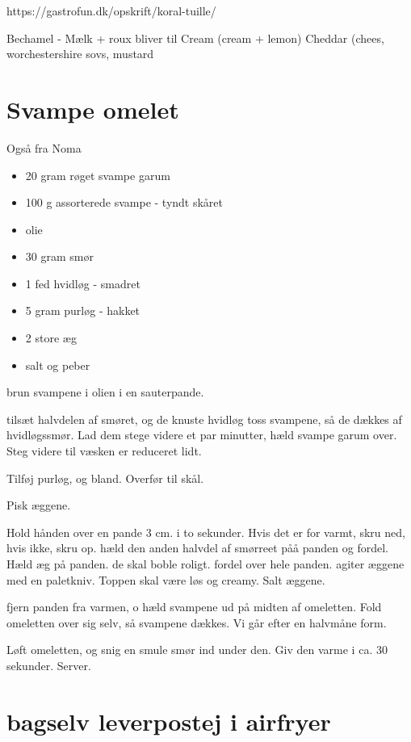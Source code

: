 \documentclass[
  letterpaper,
  DIV=11,
  numbers=noendperiod]{scrreprt}
\providecommand{\tightlist}{%
  \setlength{\itemsep}{0pt}\setlength{\parskip}{0pt}}\usepackage{longtable,booktabs,array}
\begin{document}
https://gastrofun.dk/opskrift/koral-tuille/

Bechamel - Mælk + roux bliver til Cream (cream + lemon) Cheddar (chees,
worchestershire sovs, mustard

\hypertarget{svampe-omelet}{%
\section{Svampe omelet}\label{svampe-omelet}}

Også fra Noma

\begin{itemize}
\tightlist
\item
  20 gram røget svampe garum
\item
  100 g assorterede svampe - tyndt skåret
\item
  olie
\item
  30 gram smør
\item
  1 fed hvidløg - smadret
\item
  5 gram purløg - hakket
\item
  2 store æg
\item
  salt og peber
\end{itemize}

brun svampene i olien i en sauterpande.

tilsæt halvdelen af smøret, og de knuste hvidløg toss svampene, så de
dækkes af hvidløgssmør. Lad dem stege videre et par minutter, hæld
svampe garum over. Steg videre til væsken er reduceret lidt.

Tilføj purløg, og bland. Overfør til skål.

Pisk æggene.

Hold hånden over en pande 3 cm. i to sekunder. Hvis det er for varmt,
skru ned, hvis ikke, skru op. hæld den anden halvdel af smørreet påå
panden og fordel. Hæld æg på panden. de skal boble roligt. fordel over
hele panden. agiter æggene med en paletkniv. Toppen skal være løs og
creamy. Salt æggene.

fjern panden fra varmen, o hæld svampene ud på midten af omeletten. Fold
omeletten over sig selv, så svampene dækkes. Vi går efter en halvmåne
form.

Løft omeletten, og snig en smule smør ind under den. Giv den varme i ca.
30 sekunder. Server.

\hypertarget{bagselv-leverpostej-i-airfryer}{%
\section{bagselv leverpostej i
airfryer}\label{bagselv-leverpostej-i-airfryer}}
\end{document}
